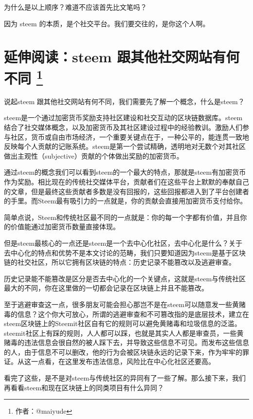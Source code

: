 \documentclass[]{ctexbook}
\begin{document}
为什么是以上顺序？难道不应该首先比文笔吗？

因为 steem 的本质，是个社交平台。我们要交往的，是你这个人啊。

\hypertarget{comparison-social}{%
\section[延伸阅读：steem 跟其他社交网站有何不同 ]{\texorpdfstring{延伸阅读：steem 跟其他社交网站有何不同 \footnote{作者：@maiyude}}{延伸阅读：steem 跟其他社交网站有何不同 }}\label{comparison-social}}

说起steem 跟其他社交网站有何不同，我们需要先了解一个概念，什么是steem？

steem是一个通过加密货币奖励支持社区建设和社交互动的区块链数据库。steem结合了社交媒体概念，以及加密货币及其社区建设过程中的经验教训。激励人们参与社区，货币或自由市场经济，一个重要关键点在于，一种公平的，能连贯一致地反映每个人贡献的记账系统。steem是第一个尝试精确，透明地对无数个对其社区做出主观性（subjective）贡献的个体做出奖励的加密货币。

通过steem的概念我们可以看到steem的一个最大的特点，那就是steem有加密货币作为奖励。相比现在的传统社交媒体平台，贡献者们在这些平台上默默的奉献自己的文章，但是最终这些贡献者多数是没有回报的，这些回报都进入到了平台创建者的手里。而Steem最有吸引力的一点就是，你的贡献会直接用加密货币支付给你。

简单点说，Steem和传统社区最不同的一点就是：你的每一个字都有价值，并且你的价值能通过加密货币数量直接体现。

但是steem最核心的一点还是steem是一个去中心化社区，去中心化是什么？关于去中心化的特点和优势不是本文讨论的范畴，我们只要知道因为steem是基于区块链的社交社区，所以它拥有区块链的特点：历史记录不能篡改以及逃避审查。

历史记录能不能篡改是区分是否去中心化的一个关键点，这就是steem与传统社区最大的不同，你在这里做的一切都会记录在区块链上并且不能篡改。

至于逃避审查这一点，很多朋友可能会担心那岂不是在steem可以随意发一些黄赌毒的信息？这个你大可放心，所谓的逃避审查和不可篡改指的是底层技术，建立在steem区块链上的Steemit社区自有它的规则可以避免黄赌毒和垃圾信息的泛滥。steemit社区上有踩的规则，人人都可以踩，也就是其实人人都是审查员，一些黄赌毒的违法信息会很自然的被人踩下去，并导致这些信息不可见。而发布这些信息的人，由于信息不可以删改，他的行为会被区块链永远的记录下来，作为牢牢的罪证。从这一点看，在这里发布违法信息，风险比在中心化社区还要高。

看完了这些，是不是对steem与传统社区的异同有了一些了解。那么接下来，我们再看看steem和现在区块链上的同类项目有什么异同？
\end{document}
